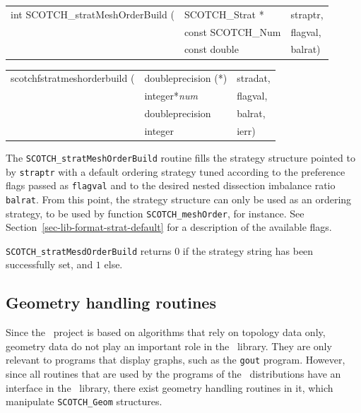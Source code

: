 \begin{itemize}
\progsyn

{\tt\begin{tabular}{l@{}ll}
int SCOTCH\_stratMeshOrderBuild ( & SCOTCH\_Strat *   & straptr, \\
                                  & const SCOTCH\_Num & flagval, \\
                                  & const double      & balrat)
\end{tabular}}

{\tt\begin{tabular}{l@{}ll}
scotchfstratmeshorderbuild ( & doubleprecision (*) & stradat, \\
                             & integer*{\it num}   & flagval, \\
                             & doubleprecision     & balrat,  \\
                             & integer             & ierr)
\end{tabular}}

\progdes

The {\tt SCOTCH\_stratMeshOrderBuild} routine fills the strategy
structure pointed to by {\tt straptr} with a default ordering strategy
tuned according to the preference flags passed as {\tt flagval} and to
the desired nested dissection imbalance ratio {\tt balrat}. From this
point, the strategy structure can only be used as an ordering
strategy, to be used by function {\tt SCOTCH\_\lbt mesh\lbt Order},
for instance. See Section~\ref{sec-lib-format-strat-default} for a
description of the available flags.

\progret

{\tt SCOTCH\_stratMesdOrderBuild} returns $0$ if the strategy string
has been successfully set, and $1$ else.
\end{itemize}

\subsection{Geometry handling routines}
\label{sec-lib-geom}

Since the \scotch\ project is based on algorithms that rely
on topology data only, geometry data do not play an
important role in the \libscotch\ library. They are only
relevant to programs that display graphs, such as the
{\tt gout} program. However, since all routines that are
used by the programs of the \scotch\ distributions have
an interface in the \libscotch\ library, there exist
geometry handling routines in it, which manipulate
{\tt SCOTCH\_\lbt Geom} structures.

